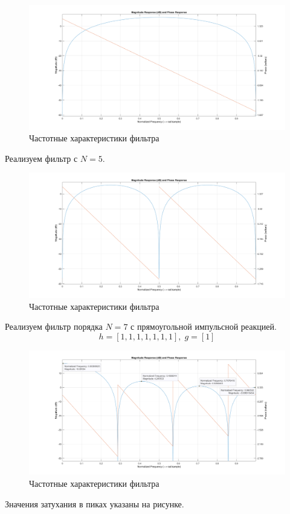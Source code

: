 \documentclass[12pt,a4paper]{article}
\begin{document}
	\begin{figure}[H]
		\centering
		\includegraphics[width=1.0\linewidth]{res/4_1_ach.png}
		\caption{Частотные характеристики фильтра}
	\end{figure}
	
	Реализуем фильтр с $N = 5$.
	\begin{figure}[H]
		\centering
		\includegraphics[width=1.0\linewidth]{res/4_1_N5.png}
		\caption{Частотные характеристики фильтра}
	\end{figure}
	
	Реализуем фильтр порядка $N = 7$ с прямоугольной импульсной реакцией.
	$$ h = [1, 1, 1, 1, 1, 1, 1], \; g = [1]$$
	\begin{figure}[H]
		\centering
		\includegraphics[width=1.0\linewidth]{res/4_2_N7.png}
		\caption{Частотные характеристики фильтра}
	\end{figure}
	Значения затухания в  пиках указаны на рисунке.
	
\end{document}
